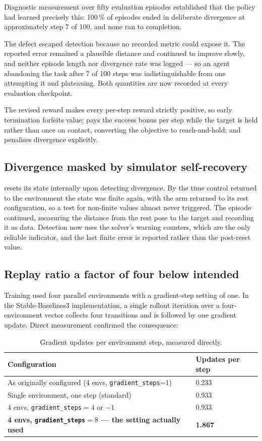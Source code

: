 Diagnostic measurement over fifty evaluation episodes established that the policy
had learned precisely this: 100\,\% of episodes ended in deliberate divergence at
approximately step 7 of 100, and none ran to completion.

The defect escaped detection because no recorded metric could expose it. The
reported error remained a plausible distance and continued to improve slowly, and
neither episode length nor divergence rate was logged --- so an agent abandoning
the task after 7 of 100 steps was indistinguishable from one attempting it and
plateauing. Both quantities are now recorded at every evaluation checkpoint.

The revised reward makes every per-step reward strictly positive, so early
termination forfeits value; pays the success bonus per step while the target is
held rather than once on contact, converting the objective to reach-and-hold; and
penalises divergence explicitly.

\subsection{Divergence masked by simulator self-recovery}

\MuJoCo{} resets its state internally upon detecting divergence. By the time
control returned to the environment the state was finite again, with the arm
returned to its rest configuration, so a test for non-finite values almost never
triggered. The episode continued, measuring the distance from the rest pose to the
target and recording it as data. Detection now uses the solver's warning
counters, which are the only reliable indicator, and the last finite error is
reported rather than the post-reset value.

\subsection{Replay ratio a factor of four below intended}
\label{sec:replaybug}

Training used four parallel environments with a gradient-step setting of one. In
the Stable-Baselines3 implementation, a single rollout iteration over a
four-environment vector collects four transitions and is followed by one gradient
update. Direct measurement confirmed the consequence:

\begin{table}[H]
\centering
\caption{Gradient updates per environment step, measured directly.}
\begin{tabular}{@{} L{8.0cm} C{4.0cm} @{}}
\toprule
\textbf{Configuration} & \textbf{Updates per step} \\
\midrule
As originally configured (4 envs, \texttt{gradient\_steps}=1) & 0.233 \\
Single environment, one step (standard) & 0.933 \\
4 envs, \texttt{gradient\_steps}$=4$ or $-1$ & 0.933 \\
\textbf{4 envs, \texttt{gradient\_steps}$=8$ --- the setting actually used} & \textbf{1.867} \\
\bottomrule
\end{tabular}
\label{tab:replayratio}
\end{table}

